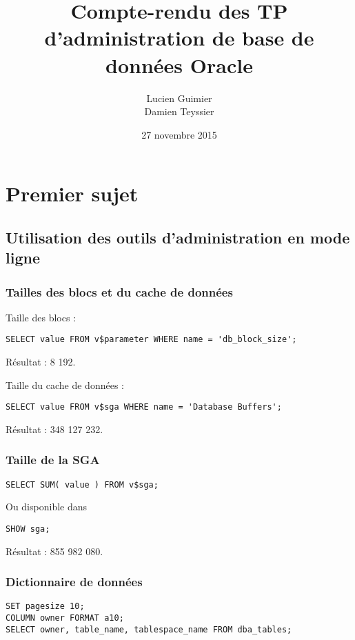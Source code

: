 \documentclass[a4paper, oneside, 12pt]{article}
\title{Compte-rendu des TP d’administration de base de données Oracle}
\author{Lucien Guimier \\ Damien Teyssier}
\date{27 novembre 2015}
\newcommand\hr\hrulefill
\begin{document}
\maketitle
\newpage
\tableofcontents
\newpage

\section{Premier sujet}
\subsection{Utilisation des outils d’administration en mode ligne}

\subsubsection{Tailles des blocs et du cache de données}

Taille des blocs :
\begin{verbatim}
SELECT value FROM v$parameter WHERE name = 'db_block_size';
\end{verbatim}

Résultat : 8 192.

\hr

Taille du cache de données :
\begin{verbatim}
SELECT value FROM v$sga WHERE name = 'Database Buffers';
\end{verbatim}

Résultat : 348 127 232.

\subsubsection{Taille de la SGA}

\begin{verbatim}
SELECT SUM( value ) FROM v$sga;
\end{verbatim}

Ou disponible dans 
\begin{verbatim}
SHOW sga;
\end{verbatim}

Résultat : 855 982 080.

\subsubsection{Dictionnaire de données}

\begin{verbatim}
SET pagesize 10;
COLUMN owner FORMAT a10;
SELECT owner, table_name, tablespace_name FROM dba_tables;
\end{verbatim}
\end{document}
